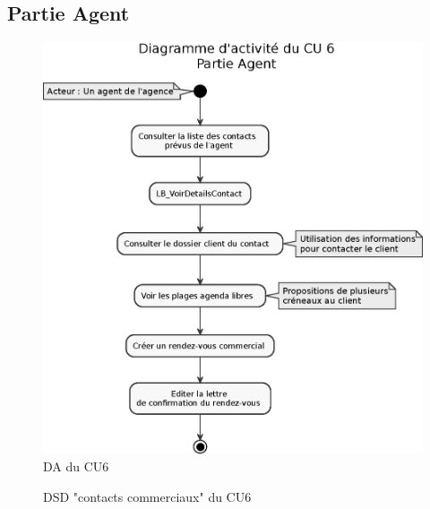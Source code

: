\subsection{Partie Agent}
\begin{figure}[H]
\centering
\includegraphics[width=\textwidth]{figures/eps/DA_CU6_partieAgent.eps}
\caption{DA du CU6}
\end{figure}

\begin{figure}[H]
\noindent{}
\caption{DSD "contacts commerciaux" du CU6}
\end{figure}

